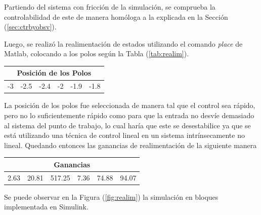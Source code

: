 %
%



Partiendo del sistema con fricción de la simulación, se comprueba la controlabilidad de este de manera homóloga a la explicada en la Sección (\ref{sec:ctrbyobsv}). 




Luego, se realizó la realimentación de estados utilizando el comando \textit{place} de Matlab, colocando a los polos según la Tabla (\ref{tab:realim}).

\begin{table}[H]
\centering
\begin{tabular}{@{}cccccc@{}}
\toprule
\multicolumn{6}{c}{Posición de los Polos} \\ \midrule
-3   & -2.5   & -2.4  & -2  & -1.9  & -1.8  \\ \bottomrule
\end{tabular}
\end{table}
\label{tab:realim}

La posición de los polos fue seleccionada de manera tal que el control sea rápido, pero no lo suficientemente rápido como para que la entrada no desvíe demasiado al sistema del punto de trabajo, lo cual haría que este se desestabilice ya que se está utilizando una técnica de control lineal en un sistema intrínsecamente no lineal.
Quedando entonces las ganancias de realimentación de la siguiente manera

\begin{table}[H]
\centering
\begin{tabular}{@{}cccccc@{}}
\toprule
\multicolumn{6}{c}{Ganancias}                    \\ \midrule
2.63 & 20.81 & 517.25 & 7.36 & 74.88 & 94.07 \\ \bottomrule
\end{tabular}
\end{table}

Se puede observar en la Figura (\ref{fig:realim}) la simulación en bloques implementada en Simulink.

